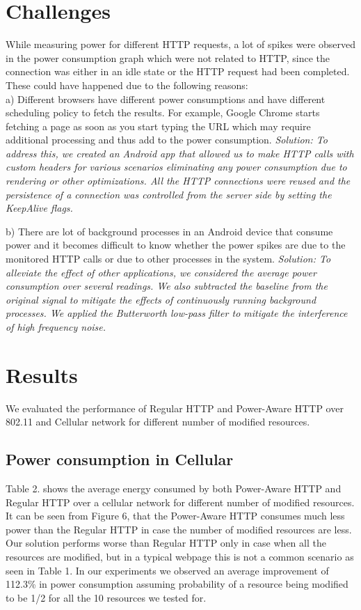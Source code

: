 \documentclass{sigplanconf}
\begin{document}
\section{ Challenges}

While measuring power for different HTTP requests, a lot of spikes were observed in the power consumption graph which were not related to HTTP, since the connection was either in an idle state or the HTTP request had been completed. These could have happened due to the following reasons: \\
a) Different browsers have different power consumptions and have different scheduling policy to fetch the results. For example, Google Chrome starts fetching a page as soon as you start typing the URL which may require additional processing and thus add to the power consumption.
\it{Solution:} \rm To address this, we created an Android app that allowed us to make HTTP calls with custom headers for various scenarios eliminating any power consumption due to rendering or other optimizations. All the HTTP connections were reused and the persistence of a connection was controlled from the server side by setting the KeepAlive flags.

b) There are lot of background processes in an Android device that consume power and it becomes difficult to know whether the power spikes are due to the monitored HTTP calls or due to other processes in the system.
\it{Solution:} \rm To alleviate the effect of other applications, we considered the average power consumption over several readings. We also subtracted the baseline from the original signal to mitigate the effects of continuously running background processes. We applied the Butterworth low-pass filter to mitigate the interference of high frequency noise.


\section{Results}
We evaluated the performance of Regular HTTP and Power-Aware HTTP over 802.11 and Cellular network for different number of modified resources.  

\subsection{Power consumption in Cellular}
Table 2. shows the average energy consumed by both Power-Aware HTTP and Regular HTTP over a cellular network for different number of modified resources. It can be seen from Figure 6, that the Power-Aware HTTP consumes much less power than the Regular HTTP in case the number of modified resources are less. Our solution performs worse than Regular HTTP only in case when all the resources are modified, but in a typical webpage this is not a common scenario as seen in Table 1. In our experiments we observed an average improvement of 112.3\% in power consumption assuming probability of a resource being modified to be 1/2 for all the 10 resources we tested for.
\end{document}
